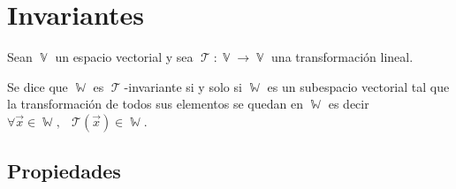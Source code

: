 \documentclass[12pt, fleqn]{report}                             %
\DeclareMathOperator \Space {\quad}                             %
\DeclareMathOperator \MiniSpace {\;}                            %
\theoremstyle{break}                                            %
\DeclareMathOperator \VectorSet    {\mathbb{V}}                 %
\DeclareMathOperator \SubVectorSet {\mathbb{W}}                 %
\DeclareMathOperator \LinTrans {\mathcal{T}}                    %
\newcommand{\Wrap}[1]    {\left( #1 \right)}                    %
\newcommand{\FnLinTrans}[1]{\mathcal{T}\Wrap{#1}}               %
\begin{document}
        \vspace{1em}
        \section{Invariantes}
            
            Sean $\VectorSet$ un espacio vectorial y sea $\LinTrans: \VectorSet \to \VectorSet$
            una transformación lineal.

            Se dice que $\SubVectorSet$ es $\LinTrans$-invariante si y solo si $\SubVectorSet$ es
            un subespacio vectorial tal que la transformación de todos sus elementos se quedan en $\SubVectorSet$
            es decir $\forall \vec x \in \SubVectorSet, \MiniSpace \FnLinTrans{\vec x} \in \SubVectorSet$.



            \vspace{1em}
            \subsection{Propiedades}
\end{document}
